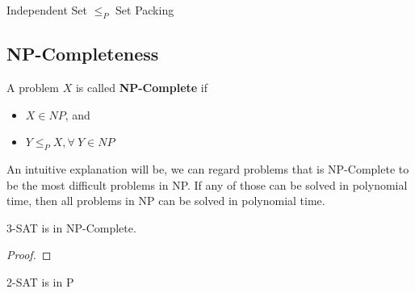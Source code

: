 					\begin{lemma}
						Independent Set $\le_P$ Set Packing
					\end{lemma}

				\subsection{NP-Completeness}
					\begin{definition}[NP-Completeness]
						A problem $X$ is called \textbf{NP-Complete} if
						\begin{itemize}
							\item $X \in NP$, and
							\item $Y \le_P X, \forall ~ Y \in NP$
						\end{itemize}
					\end{definition}

					An intuitive explanation will be, we can regard problems that is NP-Complete to be the most difficult problems in NP. If any of those can be solved in polynomial time, then all problems in NP can be solved in polynomial time.

					\begin{theorem}
						3-SAT is in NP-Complete.
					\end{theorem}

					\begin{proof}
						
					\end{proof}

					\begin{theorem}
						2-SAT is in P
					\end{theorem}

